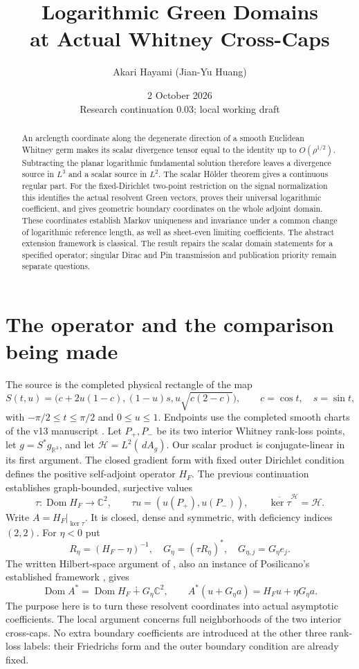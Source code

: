 \documentclass[11pt]{article}
\title{Logarithmic Green Domains\\at Actual Whitney Cross-Caps}
\author{Akari Hayami (Jian-Yu Huang)}
\date{2 October 2026\\\small Research continuation 0.03; local working draft}
\theoremstyle{remark}\newtheorem{remark}[theorem]{Remark}
\newcommand{\R}{\mathbb R}\newcommand{\C}{\mathbb C}
\newcommand{\Dom}{\operatorname{Dom}}\newcommand{\dd}{\,d}
\begin{document}
\maketitle
\begin{abstract}
An arclength coordinate along the degenerate direction of a smooth Euclidean
Whitney germ makes its scalar divergence tensor equal to the identity up to
$O(\rho^{1/2})$. Subtracting the planar logarithmic fundamental solution
therefore leaves a divergence source in $L^3$ and a scalar source in $L^2$.
The scalar H\"older theorem gives a continuous regular part. For the
fixed-Dirichlet two-point restriction on the signal normalization this identifies
the actual resolvent Green vectors, proves their universal logarithmic
coefficient, and gives geometric boundary coordinates on the whole adjoint
domain. These coordinates establish Markov uniqueness and invariance under a
common change of logarithmic reference length, as well as sheet-even limiting
coefficients. The abstract extension framework is classical. The result repairs
the scalar domain statements for a specified operator; singular Dirac and Pin
transmission and publication priority remain separate questions.
\end{abstract}

\section{The operator and the comparison being made}\label{sec:scope}
The source is the completed physical rectangle of the map
\[
 S(t,u)=\bigl(c+2u(1-c),(1-u)s,u\sqrt{c(2-c)}\bigr),\qquad
 c=\cos t,\quad s=\sin t,
\]
with $-\pi/2\leq t\leq\pi/2$ and $0\leq u\leq1$. Endpoints use the
completed smooth charts of the v13 manuscript \cite{v13}. Let $P_+,P_-$ be its
two interior Whitney rank-loss points, let $g=S^*g_{\R^3}$, and let
$\mathcal H=L^2(\dd A_g)$. Our scalar product is conjugate-linear in its
first argument. The closed gradient form with fixed outer Dirichlet condition
defines the positive self-adjoint operator $H_F$. The previous continuation
\cite{v02} establishes graph-bounded, surjective values
\[
 \tau:\Dom H_F\longrightarrow\C^2,\qquad
 \tau u=(u(P_+),u(P_-)),
 \qquad \overline{\ker\tau}^{\mathcal H}=\mathcal H.
\]
Write $A=H_F|_{\ker\tau}$. It is closed, dense and symmetric, with
deficiency indices $(2,2)$. For $\eta<0$ put
\[
 R_\eta=(H_F-\eta)^{-1},\quad
 G_\eta=(\tau R_\eta)^*,\quad G_{\eta,j}=G_\eta e_j.
\]
The written Hilbert-space argument of \cite{v02}, also an instance of
Posilicano's established framework \cite{pos}, gives
\begin{equation}\label{eq:decomposition}
 \Dom A^*=\Dom H_F\dotplus G_\eta\C^2,\qquad
 A^*(u+G_\eta a)=H_Fu+\eta G_\eta a.
\end{equation}
The purpose here is to turn these resolvent coordinates into actual asymptotic
coefficients. The local argument concerns full neighborhoods of the two
interior cross-caps. No extra boundary coefficients are introduced at the
other three rank-loss labels: their Friedrichs form and the outer boundary
condition are already fixed.
\end{document}
